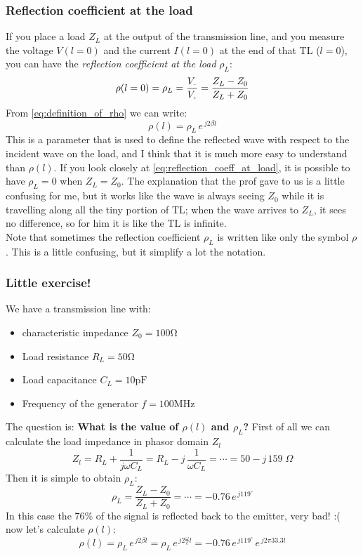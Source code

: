 \subsubsection*{Reflection coefficient at the load}
If you place a load $Z_L$ at the output of the transmission line, and you measure the voltage $V(l=0)$ and the current $I(l=0)$ at the end of that TL ($l=0$), you can have the \emph{reflection coefficient at the load} $\rho_L$:
\begin{equation}\label{eq:reflection_coeff_at_load}
    \rho(l=0)=\rho_L=\frac{V\bottomMinus}{V\bottomPlus}=\frac{Z_L-Z_0}{Z_L+Z_0}
\end{equation}
From \cref{eq:definition_of_rho} we can write:
\begin{equation}\label{eq:reflection_coeff_at_load2}
    \rho(l)=\rho_L\,e^{\,j2\beta l}
\end{equation}
This is a parameter that is used to define the reflected wave with respect to the
incident wave on the load, and I think that it is much more easy to understand than $\rho(l)$.
If you look closely at \cref{eq:reflection_coeff_at_load}, it is possible to have $\rho_L=0$ when $Z_L=Z_0$. The explanation that the prof gave to us is a little confusing for me, but it works like the wave is always seeing $Z_0$ while it is travelling along all the tiny portion of TL; when the wave arrives to $Z_L$, it sees no difference, so for him it is like the TL is infinite.\\
Note that sometimes the reflection coefficient $\rho_L$ is written like only the symbol $\rho$. This is a little confusing, but it simplify a lot the notation.
\subsubsection*{Little exercise!}
We have a transmission line with:
\begin{itemize}
    \item characteristic impedance $Z_0 = 100 \si{\ohm}$
    \item Load resistance $R_L=50 \si{\ohm}$ 
    \item Load capacitance $C_L=10 \si{\pico\farad}$
    \item Frequency of the generator $f=100\si{\mega\hertz}$
\end{itemize}
The question is: \textbf{What is the value of $\rho(l)$ and $\rho_L$?}
First of all we can calculate the load impedance in phasor domain $Z_l$
\begin{equation*}
    Z_l=R_L+\frac{1}{j\omega C_L}=R_L-j\,\frac{1}{\omega C_L}=\cdots =50-j\,159\;\Omega
\end{equation*}
Then it is simple to obtain $\rho_L$:
\begin{equation*}
    \rho_L =\frac{Z_L-Z_0}{Z_L+Z_0}=\cdots =-0.76\,e^{\,j119^{\circ}}
\end{equation*}
In this case the 76\% of the signal is reflected back to the emitter, very bad! :(\\
now let's calculate $\rho(l)$:
\begin{equation*}
    \rho(l)=\rho_L\,e^{\,j2\beta l}=\rho_L\,e^{\,j2\frac{\omega}{c} l}=-0.76\,e^{\,j119^{\circ}}\,e^{\,j 2\pi 33.3 l}
\end{equation*}
